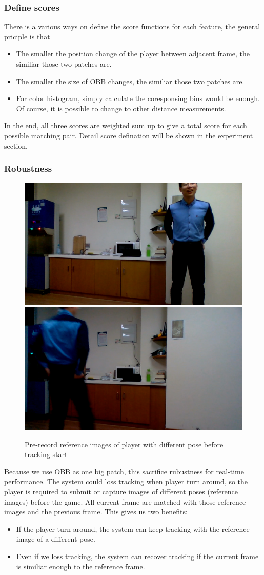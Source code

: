 \documentclass[11pt,twocolumn,letterpaper]{article}
\begin{document}
\subsubsection*{Define scores}
There is a various ways on define the score functions for each feature, the general priciple is that 
\begin{itemize}
\item The smaller the position change of the player between adjacent frame, the similiar those two patches are.
\item The smaller the size of OBB changes, the similiar those two patches are.
\item For color histogram, simply calculate the coresponsing bins would be enough. Of course, it is possible to change to other distance measurements.
\end{itemize}
\par
In the end, all three scores are weighted sum up to give a total score for each possible matching pair. Detail score defination will be shown in the experiment section.
\subsubsection*{Robustness}
\begin{figure}[h]
      \centering
      \includegraphics[width=0.45\linewidth]{./Pic/ref-1}
\includegraphics[width=0.45\linewidth]{./Pic/ref-2}
      \caption{Pre-record reference images of player with different pose before tracking start}
      \end{figure}

Because we use OBB as one big patch, this sacrifice rubustness for real-time performance. The system could loss tracking when player turn around, so the player is required to submit or capture images of different poses (reference images) before the game. All current frame are matched with those reference images and the previous frame. This gives us two benefits:
\begin{itemize}
\item If the player turn around, the system can keep tracking with the reference image of a different pose.
\item Even if we loss tracking, the system can recover tracking if the current frame is similiar enough to the reference frame.
\end{itemize}
\end{document}
